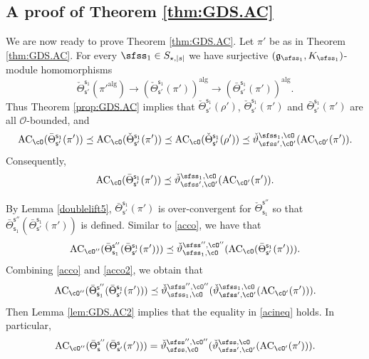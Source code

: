 \documentclass[12pt,a4paper]{amsart}
\def\abs#1{\left|{#1}\right|}
\newcommand{\CO}{{\mathcal {O}}}
\newcommand{\g}{\mathfrak g}
\newcommand{\be}{\begin {equation}}
\newcommand{\ee}{\end {equation}}
\numberwithin{equation}{section}
\theoremstyle{remark}
\def\Thetab{\bar{\Theta}}
\begin{document}
\subsection{A proof of Theorem \ref{thm:GDS.AC}}
 We are now ready to prove Theorem \ref{thm:GDS.AC}.
Let $\pi'$ be as in Theorem \ref{thm:GDS.AC}. 
For every $\sfss_1\in S_{\star, \abs{s}}$ we have 
surjective $(\g_{\sfss_1}, K_{\sfss_1})$-module homomorphisms
\[
\check \Theta_{\mathsf s'}^{\mathsf s_1}(\pi'^{\mathrm{alg}})\rightarrow \left (\check \Theta_{\mathsf s'}^{\mathsf s_1}(\pi')\right )^{\mathrm{alg}}\rightarrow 
 \left (\Thetab_{\mathsf s'}^{\mathsf s_1}(\pi')\right )^{\mathrm{alg}}. 
 \]
 Thus Theorem \ref{prop:GDS.AC} implies that  $\check \Theta_{\mathsf s'}^{\mathsf s_1}(\rho')$, $\check \Theta_{\mathsf s'}^{\mathsf s_1}(\pi')$ and $\Thetab_{\mathsf s'}^{\mathsf s_1}(\pi')$ are all $\CO$-bounded,  and
    \be\label{ineq000}
   \mathrm{AC}_{\cO}( \Thetab_{\mathsf s'}^{\mathsf s_1}(\pi'))\preceq  \mathrm{AC}_{\cO}(\check \Theta_{\mathsf s'}^{\mathsf s_1}(\pi'))\preceq  \mathrm{AC}_{\cO}(\check \Theta_{\mathsf s'}^{\mathsf s_1}(\rho'))\preceq \check \vartheta_{\sfss', \cO'}^{\sfss_1, \cO}(\mathrm{AC}_{\cO'}(\pi')).
  \ee
  Consequently, 
   \be\label{acco}
   \mathrm{AC}_{\cO}( \Thetab_{\mathsf s'}^{\mathsf s_1}(\pi'))\preceq   \check \vartheta_{\sfss', \cO'}^{\sfss_1, \cO}(\mathrm{AC}_{\cO'}(\pi')).
  \ee

By Lemma \ref{doublelift5},  $ \Thetab_{\mathsf s'}^{\mathsf s_1}(\pi')$ is over-convergent for $ \check \Theta_{\mathsf s_1}^{\mathsf s''}$ so that $\Thetab_{\mathsf s_1}^{\mathsf s''}( \Thetab_{\mathsf s'}^{\mathsf s_1}(\pi'))$ is defined.  Similar to \eqref{acco}, we have that
   \be\label{acco2}
   \mathrm{AC}_{\cO''}( \Thetab_{\mathsf s_1}^{\mathsf s''}(\Thetab_{\mathsf s'}^{\mathsf s_1}(\pi')))\preceq   \check \vartheta_{\sfss_1, \cO}^{\sfss'', \cO''}(\mathrm{AC}_{\cO}( \Thetab_{\mathsf s'}^{\mathsf s_1}(\pi'))).
  \ee
Combining \eqref{acco} and \eqref{acco2}, we obtain that
\be\label{acineq}
   \mathrm{AC}_{\cO''}( \Thetab_{\mathsf s_1}^{\mathsf s''}(\Thetab_{\mathsf s'}^{\mathsf s_1}(\pi')))\preceq   \check \vartheta_{\sfss_1, \cO}^{\sfss'', \cO''}(\check \vartheta_{\sfss', \cO'}^{\sfss_1, \cO}(\mathrm{AC}_{\cO'}(\pi'))).
\ee
Then Lemma \ref{lem:GDS.AC2} implies that the equality in \eqref{acineq} holds. In particular, 
\be\label{acineq2}
   \mathrm{AC}_{\cO''}( \Thetab_{\mathsf s}^{\mathsf s''}(\Thetab_{\mathsf s'}^{\mathsf s}(\pi')))=  \check \vartheta_{\sfss, \cO}^{\sfss'', \cO''}(\check \vartheta_{\sfss', \cO'}^{\sfss, \cO}(\mathrm{AC}_{\cO'}(\pi'))).
\ee
\end{document}
